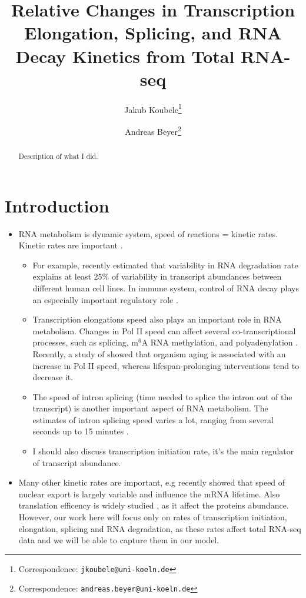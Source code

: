 \documentclass[11pt]{article}
\title{Relative Changes in Transcription Elongation, Splicing, and RNA Decay Kinetics from Total RNA-seq}
\author[1,2]{Jakub Koubele\thanks{Correspondence: \texttt{jkoubele@uni-koeln.de}}}
\author[1,2]{Andreas Beyer\thanks{Correspondence: \texttt{andreas.beyer@uni-koeln.de}}}
\affil[1]{University of Cologne, Faculty of Medicine and University Hospital Cologne, Germany}
\affil[2]{Cologne Excellence Cluster on Cellular Stress Responses in Aging-Associated Diseases (CECAD), University of Cologne, Germany}
\date{}
\begin{document}
    \maketitle

    \begin{abstract}
        Description of what I did.
    \end{abstract}


    \section{Introduction}
    \begin{itemize}
        \item RNA metabolism is dynamic system, speed of reactions = kinetic rates. Kinetic rates are important \citep{furlanDynamicsTranscriptionalPosttranscriptional2021}.
        \begin{itemize}
            \item For example, \citet{vockRNADecayCafeUniformlyProcessed2025} recently estimated that variability in RNA degradation rate explains at least 25\% of variability in transcript abundances between different human cell lines. In immune system, control of RNA decay plays an especially important regulatory role \citep{schottNetworksControllingMRNA2010}.
            \item Transcription elongations speed also plays an important role in RNA metabolism. Changes in Pol II speed can affect several co-transcriptional processes, such as splicing, $\text{m}^{6}$A RNA methylation, and polyadenylation \citep{munizRNAPolymeraseII2021}. Recently, a study of \citet{debesAgeingassociatedChangesTranscriptional2023} showed that organism aging is associated with an increase in Pol II speed, whereas lifespan-prolonging interventions tend to decrease it.
            \item The speed of intron splicing (time needed to splice the intron out of the transcript) is another important aspect of RNA metabolism. The estimates of intron splicing speed varies a lot, ranging from several seconds up to 15 minutes \citep{alpertPerfectTimingSplicing2017, shenasaPremRNASplicingIts2023, sethiSinglemoleculeMultimodalTiming2025}.
            \item I should also discuss transcription initiation rate, it's the main regulator of transcript abundance.
        \end{itemize}
        \item Many other kinetic rates are important, e.g \citet{mullerNuclearExportLimiting2024} recently showed that speed of nuclear export is largely variable and influence the mRNA lifetime. Also translation efficency is widely studied \citep{gingoldDeterminantsTranslationEfficiency2011}, as it affect the proteins abundance. However, our work here will focus only on rates of transcription initiation, elongation, splicing and RNA degradation, as these rates affect total RNA-seq data and we will be able to capture them in our model.

\end{itemize}
\end{document}
